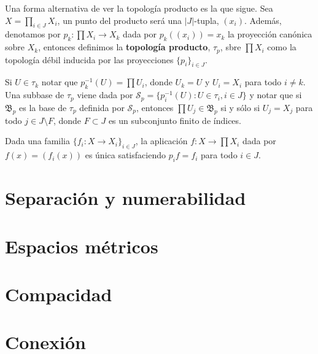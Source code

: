 \documentclass[12pt]{article}
\begin{document}
Una forma alternativa de ver la topología producto es la que sigue. Sea $X = \prod_{i\in J} X_i$, un punto del producto será una $|J|$-tupla, $(x_i)$. Además, denotamos por $p_k \colon \prod X_i \longrightarrow X_k$ dada por $p_k ((x_i)) = x_k$ la proyección canónica sobre $X_k$, entonces definimos la \textbf{topología producto}, $\tau_p$, sbre $\prod X_i$ como la topología débil inducida por las proyecciones $\lbrace p_i \rbrace_{i \in J}$.

Si $U \in \tau_k$ notar que $p_k^{-1}(U) = \prod U_i$, donde $U_k = U$ y $U_i = X_i$ para todo $i \neq k$. Una subbase de $\tau_p$ viene dada por $\mathcal{S}_p = \lbrace p_i^{-1}(U) : U \in \tau_i, i \in J \rbrace$ y notar que si $\mathfrak{B}_p$ es la base de $\tau_p$ definida por $\mathcal{S}_p$, entonces $\prod U_j \in \mathfrak{B}_p$ si y sólo si $U_j = X_j$ para todo $j \in J \setminus F$, donde $F \subset J$ es un subconjunto finito de índices.

Dada una familia $\lbrace f_i \colon X \longrightarrow X_i \rbrace_{i \in J}$, la aplicación $f \colon X \longrightarrow \prod X_i$ dada por $f(x) = (f_i(x))$ es única satisfaciendo $p_if = f_i$ para todo $i \in J$.
\section{Separación y numerabilidad}
\section{Espacios métricos}
\section{Compacidad}
\section{Conexión}
\end{document}
